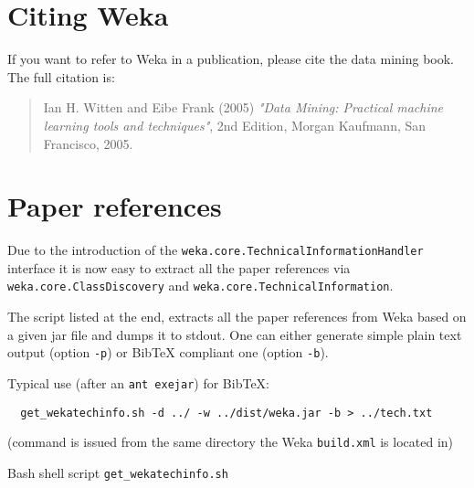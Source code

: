 %
%
%
%


\section{Citing Weka}
If you want to refer to Weka in a publication, please cite the data mining book. The full citation is:

\begin{quote}
Ian H. Witten and Eibe Frank (2005) \textit{"Data Mining: Practical machine learning tools and techniques"}, 2nd Edition, Morgan Kaufmann, San Francisco, 2005.
\end{quote}

\section{Paper references}
Due to the introduction of the \texttt{weka.core.TechnicalInformationHandler} interface it is now easy to extract all the paper references via \texttt{weka.core.ClassDiscovery} and \texttt{weka.core.TechnicalInformation}.

The script listed at the end, extracts all the paper references from Weka based on a given jar file and dumps it to stdout. One can either generate simple plain text output (option \texttt{-p}) or BibTeX compliant one (option \texttt{-b}).

Typical use (after an \texttt{ant exejar}) for BibTeX:

\begin{verbatim}
  get_wekatechinfo.sh -d ../ -w ../dist/weka.jar -b > ../tech.txt
\end{verbatim}

\noindent (command is issued from the same directory the Weka \texttt{build.xml} is located in)

\newpage
\noindent Bash shell script \texttt{get\_wekatechinfo.sh}
{\scriptsize

} 

